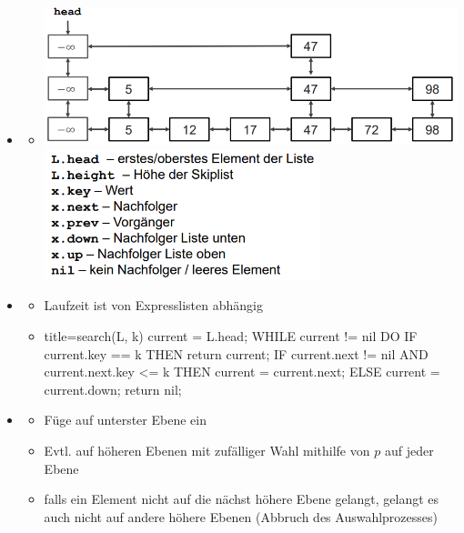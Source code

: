 \documentclass[
    12pt,
    a4paper,
    ngerman,
    color=3b,%
    marginpar=false,
    colorback=false,
    leqno,
]{tudaexercise}
\begin{document}
\begin{itemize}
        \item {}
            \begin{itemize}
                \item[]
                        \includegraphics[width=12cm]{pictures/skiplistImplement1.PNG}\\
                        \includegraphics[width=8cm]{pictures/skiplistImplement2.PNG}
            \end{itemize}
\clearpage
        \item {}
            \begin{itemize}
                \item Laufzeit ist von Expresslisten abhängig
                \item[]
                    \begin{ccode}[autogobble]{title={search(L, k)}}
                    current = L.head;
                    WHILE current != nil DO
                        IF current.key == k THEN 
                            return current;
                        IF current.next != nil AND current.next.key <= k THEN
                            current = current.next;
                        ELSE
                            current = current.down;
                    return nil;
                    \end{ccode}
            \end{itemize}

        \item {}
            \begin{itemize}
                \item Füge auf unterster Ebene ein
                \item Evtl. auf höheren Ebenen mit zufälliger Wahl mithilfe von $p$ auf jeder Ebene
                \item falls ein Element nicht auf die nächst höhere Ebene gelangt, gelangt es auch nicht auf andere höhere Ebenen (Abbruch des Auswahlprozesses)
            \end{itemize}


\end{itemize}
\end{document}
